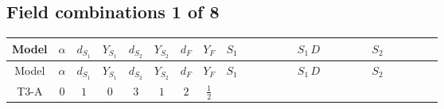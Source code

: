\documentclass[8pt]{article}
\begin{document}
\begin{landscape}
\subsection*{Field combinations 1 of 8}
\begin{longtable}{@{}cccccccc >{\raggedright\arraybackslash}p{0.21\linewidth} >{\raggedright\arraybackslash}p{0.21\linewidth} >{\raggedright\arraybackslash}p{0.21\linewidth}@{}}
\toprule
Model & $\alpha$ & $d_{S_1}$ & $Y_{S_1}$ & $d_{S_2}$ & $Y_{S_2}$ & $d_F$ & $Y_F$ & $S_1$ & $S_1\,D$ & $S_2$ \\
\midrule
\endfirsthead
\toprule
Model & $\alpha$ & $d_{S_1}$ & $Y_{S_1}$ & $d_{S_2}$ & $Y_{S_2}$ & $d_F$ & $Y_F$ & $S_1$ & $S_1\,D$ & $S_2$ \\
\midrule
\endhead
T3-A & $0$ & $1$ & $0$ & $3$ & $1$ & $2$ & $\frac{1}{2}$ & \scriptsize\adjustbox{max width=\linewidth}{$\begin{gathered} -\frac{2 \hbar  \overline{y_{1,i_1,r_1}} \overline{y_{1,i_2,r_2}} S_1^2 y_{1,i_1,r_2} y_{1,i_2,r_1} \left(S_1{}^{\dagger }\right){}^2}{\epsilon } \\ +C_{S_1^\dagger S_1} S_1 S_1{}^{\dagger } \\ -C_{S_1^\dagger S_1} \hbar  \overline{y_{1,i_1,r_1}} S_1 y_{1,i_1,r_1} S_1{}^{\dagger }\end{gathered}$} & \scriptsize\adjustbox{max width=\linewidth}{$\begin{gathered} +D_{\mu _1}\left(S_1\right){}^{\dagger } D_{\mu _1}\left(S_1\right)\end{gathered}$} & \scriptsize\adjustbox{max width=\linewidth}{$\begin{gathered} +\frac{2 \hbar  \overline{y_{2,i_1,r_1}} \overline{y_{2,i_2,r_2}} S_{2,j_2}^2 y_{2,i_1,r_2} y_{2,i_2,r_1} \left(S_{2,j_1}{}^{\dagger }\right){}^2}{3 \epsilon } \\ +C_{S_2^\dagger S_2} S_{2,j_1} S_{2,j_1}{}^{\dagger } \\ -\frac{C_{S_2^\dagger S_2} \hbar  \overline{y_{2,i_1,r_1}} S_{2,j_1} y_{2,i_1,r_1} S_{2,j_1}{}^{\dagger }}{\sqrt{3}}\end{gathered}$} \\

\end{longtable}
\end{landscape}
\end{document}

